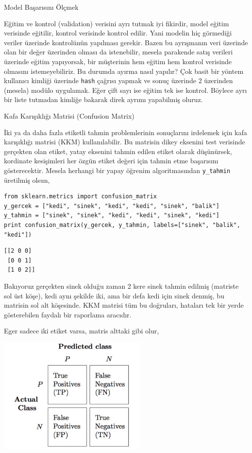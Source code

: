 \documentclass[12pt,fleqn]{article}\usepackage{../../common}
\begin{document}
Model Başarısını Ölçmek

Eğitim ve kontrol (validation) verisini ayrı tutmak iyi fikirdir, model
eğitim verisinde eğitilir, kontrol verisinde kontrol edilir. Yani modelin
hiç görmediği veriler üzerinde kontrolünün yapılması gerekir. Bazen bu
ayrışmanın veri üzerinde olan bir değer üzerinden olması da istenebilir,
mesela parakende satış verileri üzerinde eğitim yapıyorsak, bir müşterinin
hem eğitim hem kontrol verisinde olmasını istemeyebiliriz. Bu durumda
ayırma nasıl yapılır? Çok basit bir yöntem kullanıcı kimliği üzerinde
\verb!hash! çağrısı yapmak ve sonuç üzerinde 2 üzerinden (mesela) modülo
uygulamak. Eğer çift sayı ise eğitim tek ise kontrol. Böylece ayrı bir
liste tutmadan kimliğe bakarak direk ayrımı yapabilmiş oluruz.  

Kafa Karışıklığı Matrisi (Confusion Matrix) 

İki ya da daha fazla etiketli tahmin problemlerinin sonuçlarını irdelemek
için kafa karışıklığı matrisi (KKM) kullanılabilir. Bu matrisin dikey
eksenini test verisinde gerçekten olan etiket, yatay eksenini tahmin edilen
etiket olarak düşünürsek, kordinate kesişimleri her özgün etiket değeri
için tahmin etme başarısını gösterecektir. Mesela herhangi bir yapay
öğrenim algoritmasından \verb!y_tahmin! üretilmiş olsun,

\begin{verbatim}
from sklearn.metrics import confusion_matrix
y_gercek = ["kedi", "sinek", "kedi", "kedi", "sinek", "balik"]
y_tahmin = ["sinek", "sinek", "kedi", "kedi", "sinek", "kedi"]
print confusion_matrix(y_gercek, y_tahmin, labels=["sinek", "balik", "kedi"])
\end{verbatim}

\begin{verbatim}
[[2 0 0]
 [0 0 1]
 [1 0 2]]
\end{verbatim}

Bakıyoruz gerçekten sinek olduğu zaman 2 kere sinek tahmin edilmiş
(matriste sol üst köşe), kedi aynı şekilde iki, ama bir defa kedi için
sinek denmiş, bu matrisin sol alt köşesinde. KKM matrisi tüm bu doğruları,
hataları tek bir yerde gösterebilen faydalı bir raporlama aracıdır. 

Eger sadece iki etiket varsa, matris alttaki gibi olur,

\includegraphics[width=20em]{modeval_06.png}
\end{document}
